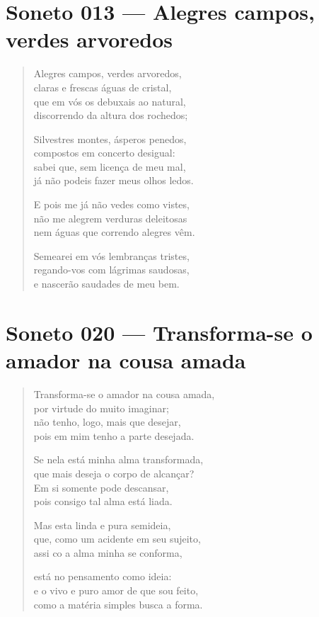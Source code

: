 \documentclass[10pt,a5paper,oneside]{book}
\begin{document}
\chapter{Soneto 013 --- Alegres campos, verdes arvoredos}

\begin{verse}
Alegres campos, verdes arvoredos,\\
claras e frescas águas de cristal,\\
que em vós os debuxais ao natural,\\
discorrendo da altura dos rochedos;

Silvestres montes, ásperos penedos,\\
compostos em concerto desigual:\\
sabei que, sem licença de meu mal,\\
já não podeis fazer meus olhos ledos.

E pois me já não vedes como vistes,\\
não me alegrem verduras deleitosas\\
nem águas que correndo alegres vêm.

Semearei em vós lembranças tristes,\\
regando-vos com lágrimas saudosas,\\
e nascerão saudades de meu bem.
\end{verse}

\chapter{Soneto 020 --- Transforma-se o amador na cousa amada}

\begin{verse}
Transforma-se o amador na cousa amada,\\
por virtude do muito imaginar;\\
não tenho, logo, mais que desejar,\\
pois em mim tenho a parte desejada.

Se nela está minha alma transformada,\\
que mais deseja o corpo de alcançar?\\
Em si somente pode descansar,\\
pois consigo tal alma está liada.

Mas esta linda e pura semideia,\\
que, como um acidente em seu sujeito,\\
assi co a alma minha se conforma,

está no pensamento como ideia:\\
e o vivo e puro amor de que sou feito,\\
como a matéria simples busca a forma.
\end{verse}
\end{document}

